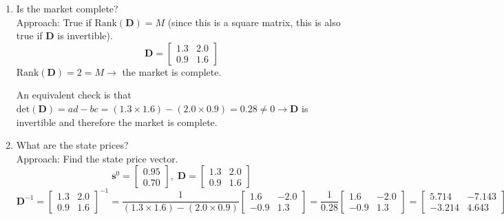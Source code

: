 \documentclass[11pt]{article}
\begin{document}
\begin{enumerate}
    \item Is the market complete? \\
    Approach: True if $\text{Rank}(\boldsymbol{D})=M$ (since this is a square matrix, this is 
    also true if $\boldsymbol{D}$ is invertible).
    \[
    \boldsymbol{D} = \begin{bmatrix}
        1.3 & 2.0 \\ 
        0.9 & 1.6
    \end{bmatrix}
    \] 
    $\text{Rank}(\boldsymbol{D})=2=M \rightarrow$ the market is complete.
    
    An equivalent check is that $\text{det}(\boldsymbol{D}) = ad - bc = (1.3 \times 1.6) - (2.0
    \times 0.9) = 0.28 \ne 0 \rightarrow \boldsymbol{D}$ is invertible and therefore the
    market is complete.
    \item What are the state prices? \\
    Approach: Find the state price vector.
    \[
    \boldsymbol{s}^0 = 
    \begin{bmatrix}
        0.95 \\ 
        0.70
    \end{bmatrix}, \;    
    \boldsymbol{D} = \begin{bmatrix}
        1.3 & 2.0 \\ 
        0.9 & 1.6
    \end{bmatrix}
    \]
    \[
    \boldsymbol{D}^{-1} =    
    {\begin{bmatrix}
        1.3 & 2.0 \\ 
        0.9 & 1.6
    \end{bmatrix}}^{-1} = \frac{1}{(1.3 \times 1.6) - (2.0 \times 0.9)} 
    \begin{bmatrix}
        1.6 & -2.0 \\
        -0.9 & 1.3
    \end{bmatrix} = \frac{1}{0.28}
    \begin{bmatrix}
        1.6 & -2.0 \\
        -0.9 & 1.3
    \end{bmatrix} = 
    \begin{bmatrix}
        5.714 & -7.143 \\
        -3.214 & 4.643
    \end{bmatrix} 
    \]
    

\end{enumerate}
\end{document}
